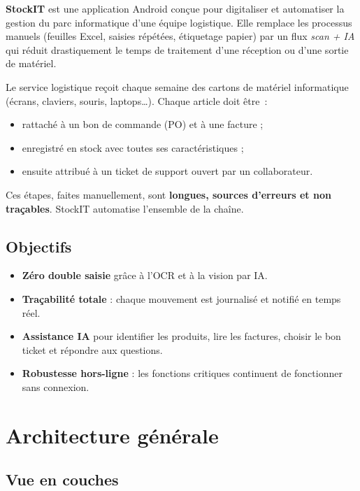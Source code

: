 \documentclass[11pt,a4paper]{article}
\begin{document}
\textbf{StockIT} est une application Android conçue pour digitaliser et
automatiser la gestion du parc informatique d'une équipe logistique.
Elle remplace les processus manuels (feuilles Excel, saisies répétées,
étiquetage papier) par un flux \emph{scan + IA} qui réduit
drastiquement le temps de traitement d'une réception ou d'une sortie
de matériel.

\begin{infobox}
Le service logistique reçoit chaque semaine des cartons de matériel
informatique (écrans, claviers, souris, laptops\dots). Chaque article
doit être~:
\begin{itemize}
  \item rattaché à un bon de commande (PO) et à une facture ;
  \item enregistré en stock avec toutes ses caractéristiques ;
  \item ensuite attribué à un ticket de support ouvert par un
        collaborateur.
\end{itemize}
Ces étapes, faites manuellement, sont \textbf{longues, sources
d'erreurs et non traçables}. StockIT automatise l'ensemble de la chaîne.
\end{infobox}

\subsection{Objectifs}
\begin{itemize}
  \item \textbf{Zéro double saisie} grâce à l'OCR et à la vision par IA.
  \item \textbf{Traçabilité totale} : chaque mouvement est journalisé
        et notifié en temps réel.
  \item \textbf{Assistance IA} pour identifier les produits, lire les
        factures, choisir le bon ticket et répondre aux questions.
  \item \textbf{Robustesse hors-ligne} : les fonctions critiques
        continuent de fonctionner sans connexion.
\end{itemize}

\section{Architecture générale}

\subsection{Vue en couches}
\end{document}
